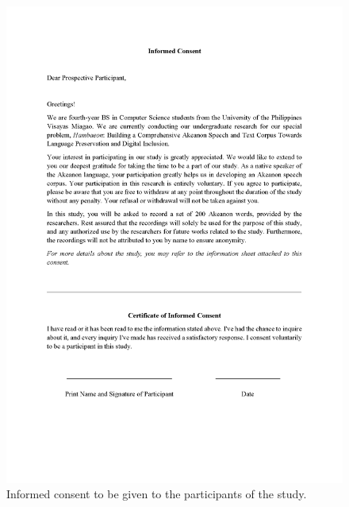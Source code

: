\begin{figure}[h!]
    \centering
    \includegraphics[width=\textwidth]{./appendix/informed-consent-1.png}
    \caption{Informed consent to be given to the participants of the study.}
    \label{fig:bible}
\end{figure}

